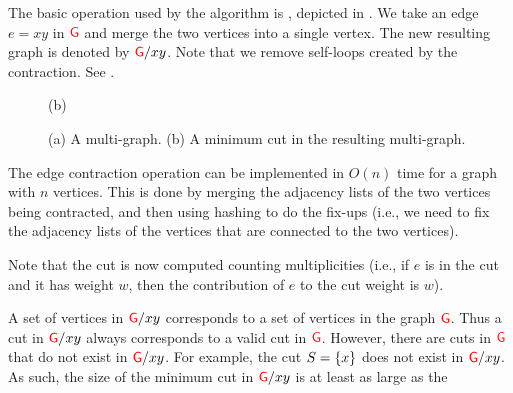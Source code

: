 The basic operation used by the algorithm is , depicted in .  We take
an edge $e=x y$ in ${\textcolor{red}{\mathsf{G}}}$ and merge the two vertices into a single
vertex.  The new resulting graph is denoted by ${\textcolor{red}{\mathsf{G}}}/ x y$.  Note
that we remove self-loops created by the contraction.  %
See .


\begin{figure}[t]
   \centering
                  {}{(b)}%
   \caption{(a) A multi-graph. (b) A minimum cut in the resulting multi-graph.}%
\end{figure}

The edge contraction operation can be implemented in $O(n)$ time for a
graph with $n$ vertices. This is done by merging the adjacency lists
of the two vertices being contracted, and then using hashing to do the
fix-ups (i.e., we need to fix the adjacency lists of the vertices that
are connected to the two vertices).

Note that the cut is now computed counting multiplicities (i.e., if
$e$ is in the cut and it has weight $w$, then the contribution of $e$
to the cut weight is $w$).


\begin{observation}
    A set of vertices in ${\textcolor{red}{\mathsf{G}}}/x y$ corresponds to a set of vertices
    in the graph ${\textcolor{red}{\mathsf{G}}}$. Thus a cut in ${\textcolor{red}{\mathsf{G}}}/x y$ always
    corresponds to a valid cut in ${\textcolor{red}{\mathsf{G}}}$. However, there are cuts in
    ${\textcolor{red}{\mathsf{G}}}$ that do not exist in ${\textcolor{red}{\mathsf{G}}}/ x y$. For example, the cut
    $S = \left\{ {x} \right\}$ does not exist in ${\textcolor{red}{\mathsf{G}}}/ x y$. As such, the size
    of the minimum cut in ${\textcolor{red}{\mathsf{G}}}/x y$ is at least as large as the
\end{observation}

